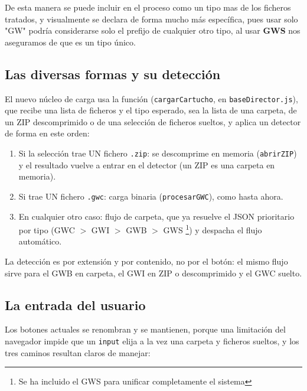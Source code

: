 De esta manera se puede incluir en el proceso como un tipo mas de los ficheros 
tratados, y visualmente se declara de forma mucho  más específica, pues usar 
solo "GW" podría considerarse solo el prefijo de cualquier otro tipo, al usar 
\textbf{GWS} nos aseguramos de que es un tipo único.

\subsection{Las diversas formas y su detección}
\label{sec:F5I9Formas}

El nuevo núcleo de carga  usa la función (\texttt{cargarCartucho}, en
\texttt{baseDirector.js}), que recibe una lista de ficheros y el tipo
esperado, sea la lista de una carpeta, de un ZIP descomprimido o de
una selección de ficheros sueltos, y aplica un detector de forma en
este orden:

\begin{enumerate}
	\item Si la selección trae UN fichero \texttt{.zip}: se
	descomprime en memoria (\texttt{abrirZIP}) y el resultado vuelve a
	entrar en el detector (un ZIP es una carpeta en memoria).
	
	\item Si trae UN fichero \texttt{.gwc}: carga binaria
	(\texttt{procesarGWC}), como hasta ahora.
	
	\item En cualquier otro caso: flujo de carpeta, que ya resuelve el
	JSON prioritario por tipo (GWC $>$ GWI $>$ GWB  $>$ GWS
	\footnote{Se ha incluido el GWS para unificar completamente el sistema}) 
	y despacha el flujo automático.
\end{enumerate}

La detección es por extensión y por contenido, no por el botón: el
mismo flujo sirve para el GWB en carpeta, el GWI en ZIP o descomprimido
y el GWC suelto.

\subsection{La entrada del usuario}
\label{sec:F5I9Entrada}

Los botones actuales se renombran y se mantienen, porque una
limitación del navegador impide que un \texttt{input} elija a la vez
una carpeta y ficheros sueltos, y los tres caminos resultan claros
de manejar:

